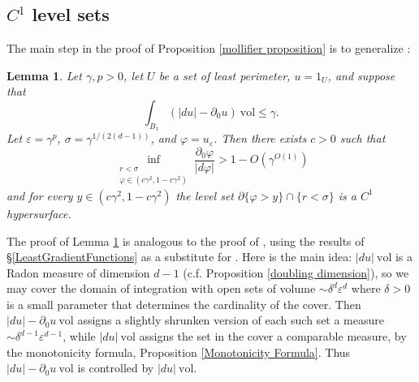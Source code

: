 \documentclass[reqno,12pt,letterpaper]{amsart}
\newcommand{\vol}{\mathrm{vol}}
\newtheorem{lemma}[theorem]{Lemma}
\theoremstyle{definition}
\numberwithin{equation}{section}
\begin{document}

\subsection{$C^1$ level sets}
The main step in the proof of Proposition \ref{mollifier proposition} is to generalize \cite[Theorem 7.3, Remark 7.4]{Giusti77}:

\begin{lemma}\label{main mollifier lemma}
Let $\gamma, p > 0$, let $U$ be a set of least perimeter, $u = 1_U$, and suppose that
\begin{equation}\label{hypothesis on main mollifier lemma}
\int_{B_1} (|du| - \partial_0 u) ~\vol \leq \gamma.
\end{equation}
Let $\varepsilon = \gamma^p$, $\sigma = \gamma^{1/(2(d - 1))}$, and $\varphi = u_\varepsilon$. Then there exists $c > 0$ such that
\begin{equation}\label{claim on main mollifier lemma}
\inf_{\substack{r < \sigma\\\varphi \in (c\gamma^2, 1 - c\gamma^2)}} \frac{\partial_0 \varphi}{|d\varphi|} > 1 - O(\gamma^{O(1)})
\end{equation}
and for every $y \in (c\gamma^2, 1 - c\gamma^2)$ the level set $\partial \{\varphi > y\} \cap \{r < \sigma\}$ is a $C^1$ hypersurface.
\end{lemma}

The proof of Lemma \ref{main mollifier lemma} is analogous to the proof of \cite[Theorem 7.3]{Giusti77}, using the results of \S\ref{LeastGradientFunctions} as a substitute for \cite[Chapter 5]{Giusti77}.
Here is the main idea: $|du| ~\vol$ is a Radon measure of dimension $d - 1$ (c.f. Proposition \ref{doubling dimension}), so we may cover the domain of integration with open sets of volume $\sim \delta^d\varepsilon^d$ where $\delta > 0$ is a small parameter that determines the cardinality of the cover.
Then $|du| - \partial_0u ~\vol$ assigns a slightly shrunken version of each such set a measure $\sim \delta^{d - 1} \varepsilon^{d - 1}$, while $|du|~\vol$ assigns the set in the cover a comparable measure, by the monotonicity formula, Proposition \ref{Monotonicity Formula}.
Thus $|du| - \partial_0u ~\vol$ is controlled by $|du|~\vol$.
\end{document}
